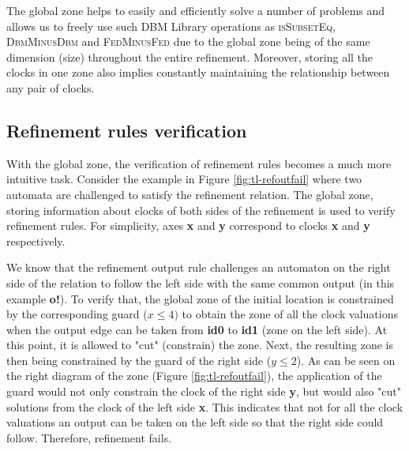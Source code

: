 The global zone helps to easily and efficiently solve a number of problems and allows us to freely use such DBM Library operations as \textsc{isSubsetEq}, \textsc{DbmMinusDbm} and \textsc{FedMinusFed} due to the global zone being of the same dimension (size) throughout the entire refinement. Moreover, storing all the clocks in one zone also implies constantly maintaining the relationship between any pair of clocks.

\subsection{Refinement rules verification}
With the global zone, the verification of refinement rules becomes a much more intuitive task. Consider the example in Figure \ref{fig:tl-refoutfail} where two automata are challenged to satisfy the refinement relation. The global zone, storing information about clocks of both sides of the refinement is used to verify refinement rules. For simplicity, axes \textbf{x} and \textbf{y} correspond to clocks \textbf{x} and \textbf{y} respectively. 

We know that the refinement output rule challenges an automaton on the right side of the relation to follow the left side with the same common output (in this example \textbf{o!}). To verify that, the global zone of the initial location is constrained by the corresponding guard ($x \leq 4)$ to obtain the zone of all the clock valuations when the output edge can be taken from \textbf{id0} to \textbf{id1} (zone on the left side). At this point, it is allowed to "cut" (constrain) the zone. Next, the resulting zone is then being constrained by the guard of the right side ($y \leq 2$). As can be seen on the right diagram of the zone (Figure \ref{fig:tl-refoutfail}), the application of the guard would not only constrain the clock of the right side \textbf{y}, but would also "cut" solutions from the clock of the left side \textbf{x}. This indicates that not for all the clock valuations an output can be taken on the left side so that the right side could follow. Therefore, refinement fails.

